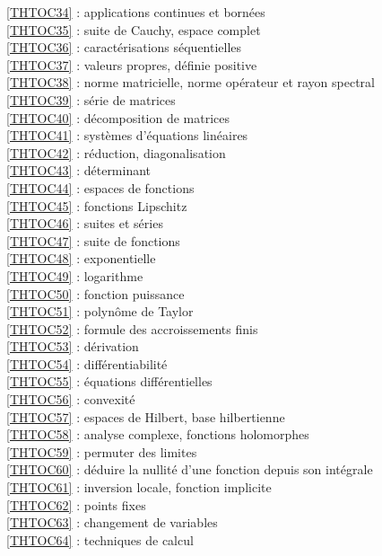 \ref {THTOC34} : applications continues et bornées\\
\ref {THTOC35} : suite de Cauchy, espace complet\\
\ref {THTOC36} : caractérisations séquentielles\\
\ref {THTOC37} : valeurs propres, définie positive\\
\ref {THTOC38} : norme matricielle, norme opérateur et rayon spectral\\
\ref {THTOC39} : série de matrices\\
\ref {THTOC40} : décomposition de matrices\\
\ref {THTOC41} : systèmes d'équations linéaires\\
\ref {THTOC42} : réduction, diagonalisation\\
\ref {THTOC43} : déterminant\\
\ref {THTOC44} : espaces de fonctions\\
\ref {THTOC45} : fonctions Lipschitz\\
\ref {THTOC46} : suites et séries\\
\ref {THTOC47} : suite de fonctions\\
\ref {THTOC48} : exponentielle\\
\ref {THTOC49} : logarithme\\
\ref {THTOC50} : fonction puissance\\
\ref {THTOC51} : polynôme de Taylor\\
\ref {THTOC52} : formule des accroissements finis\\
\ref {THTOC53} : dérivation\\
\ref {THTOC54} : différentiabilité\\
\ref {THTOC55} : équations différentielles\\
\ref {THTOC56} : convexité\\
\ref {THTOC57} : espaces de Hilbert, base hilbertienne\\
\ref {THTOC58} : analyse complexe, fonctions holomorphes\\
\ref {THTOC59} : permuter des limites\\
\ref {THTOC60} : déduire la nullité d'une fonction depuis son intégrale\\
\ref {THTOC61} : inversion locale, fonction implicite\\
\ref {THTOC62} : points fixes\\
\ref {THTOC63} : changement de variables\\
\ref {THTOC64} : techniques de calcul\\
